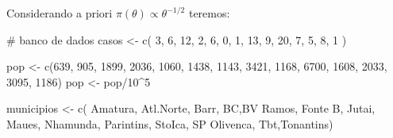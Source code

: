 \documentclass[
  letterpaper,
  DIV=11,
  numbers=noendperiod]{scrreprt}
\newenvironment{Shaded}{\begin{snugshade}}{\end{snugshade}}
\newcommand{\CommentTok}[1]{\textcolor[rgb]{0.37,0.37,0.37}{#1}}
\newcommand{\DecValTok}[1]{\textcolor[rgb]{0.68,0.00,0.00}{#1}}
\newcommand{\FunctionTok}[1]{\textcolor[rgb]{0.28,0.35,0.67}{#1}}
\newcommand{\NormalTok}[1]{\textcolor[rgb]{0.00,0.23,0.31}{#1}}
\newcommand{\OtherTok}[1]{\textcolor[rgb]{0.00,0.23,0.31}{#1}}
\newcommand{\SpecialCharTok}[1]{\textcolor[rgb]{0.37,0.37,0.37}{#1}}
\newcommand{\StringTok}[1]{\textcolor[rgb]{0.13,0.47,0.30}{#1}}
\theoremstyle{definition}
\theoremstyle{definition}
\theoremstyle{remark}
\begin{document}
Considerando a priori \(\pi(\theta)\varpropto \theta^{-1/2}\) teremos:

\begin{Shaded}
\begin{Highlighting}[]
\CommentTok{\# banco de dados}
\NormalTok{casos }\OtherTok{\textless{}{-}} \FunctionTok{c}\NormalTok{( }\DecValTok{3}\NormalTok{, }\DecValTok{6}\NormalTok{, }\DecValTok{12}\NormalTok{, }\DecValTok{2}\NormalTok{, }\DecValTok{6}\NormalTok{, }\DecValTok{0}\NormalTok{, }\DecValTok{1}\NormalTok{, }\DecValTok{13}\NormalTok{, }\DecValTok{9}\NormalTok{, }\DecValTok{20}\NormalTok{, }\DecValTok{7}\NormalTok{, }\DecValTok{5}\NormalTok{, }\DecValTok{8}\NormalTok{, }\DecValTok{1}\NormalTok{ )   }

\NormalTok{pop }\OtherTok{\textless{}{-}} \FunctionTok{c}\NormalTok{(}\DecValTok{639}\NormalTok{, }\DecValTok{905}\NormalTok{, }\DecValTok{1899}\NormalTok{, }\DecValTok{2036}\NormalTok{, }\DecValTok{1060}\NormalTok{, }\DecValTok{1438}\NormalTok{, }\DecValTok{1143}\NormalTok{, }\DecValTok{3421}\NormalTok{, }\DecValTok{1168}\NormalTok{, }\DecValTok{6700}\NormalTok{, }\DecValTok{1608}\NormalTok{, }\DecValTok{2033}\NormalTok{, }\DecValTok{3095}\NormalTok{, }\DecValTok{1186}\NormalTok{)}
\NormalTok{pop }\OtherTok{\textless{}{-}}\NormalTok{ pop}\SpecialCharTok{/}\DecValTok{10}\SpecialCharTok{\^{}}\DecValTok{5}

\NormalTok{municipios }\OtherTok{\textless{}{-}} \FunctionTok{c}\NormalTok{( }\StringTok{\textquotesingle{}Amatura\textquotesingle{}}\NormalTok{, }\StringTok{\textquotesingle{}Atl.Norte\textquotesingle{}}\NormalTok{, }\StringTok{\textquotesingle{}Barr\textquotesingle{}}\NormalTok{, }\StringTok{\textquotesingle{}BC\textquotesingle{}}\NormalTok{,}\StringTok{\textquotesingle{}BV Ramos\textquotesingle{}}\NormalTok{, }\StringTok{\textquotesingle{}Fonte B\textquotesingle{}}\NormalTok{, }\StringTok{\textquotesingle{}Jutai\textquotesingle{}}\NormalTok{, }\StringTok{\textquotesingle{}Maues\textquotesingle{}}\NormalTok{, }\StringTok{\textquotesingle{}Nhamunda\textquotesingle{}}\NormalTok{, }\StringTok{\textquotesingle{}Parintins\textquotesingle{}}\NormalTok{, }\StringTok{\textquotesingle{}StoIca\textquotesingle{}}\NormalTok{, }\StringTok{\textquotesingle{}SP Olivenca\textquotesingle{}}\NormalTok{, }\StringTok{\textquotesingle{}Tbt\textquotesingle{}}\NormalTok{,}\StringTok{\textquotesingle{}Tonantins\textquotesingle{}}\NormalTok{)}
\end{Highlighting}
\end{Shaded}
\end{document}
